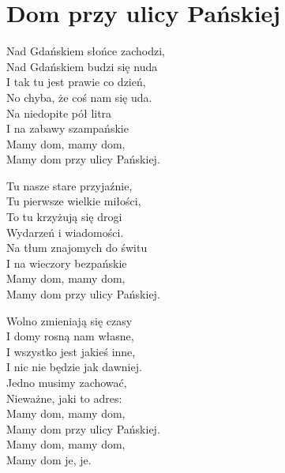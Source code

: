 \section{Dom przy ulicy Pańskiej}
\begin{text}
    Nad Gdańskiem słońce zachodzi,\\
    Nad Gdańskiem budzi się nuda\\
    I tak tu jest prawie co dzień,\\
    No chyba, że coś nam się uda.\\
    Na niedopite pół litra\\
    I na zabawy szampańskie\\
    \vin Mamy dom, mamy dom,\\
    \vin Mamy dom przy ulicy Pańskiej.

    Tu nasze stare przyjaźnie,\\
    Tu pierwsze wielkie miłości,\\
    To tu krzyżują się drogi\\
    Wydarzeń i wiadomości.\\
    Na tłum znajomych do świtu\\
    I na wieczory bezpańskie\\
    \vin Mamy dom, mamy dom,\\
    \vin Mamy dom przy ulicy Pańskiej.

    Wolno zmieniają się czasy\\
    I domy rosną nam własne,\\
    I wszystko jest jakieś inne,\\
    I nic nie będzie jak dawniej.\\
    Jedno musimy zachować,\\
    Nieważne, jaki to adres:\\
    \vin Mamy dom, mamy dom,\\
    \vin Mamy dom przy ulicy Pańskiej.\\
    \vin Mamy dom, mamy dom,\\
    \vin Mamy dom je, je.
\end{text}